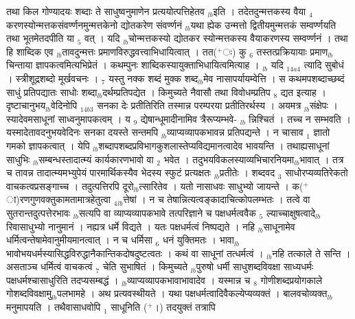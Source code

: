 \documentclass[article,12pt,a4paper]{memoir}%
\newcommand{\add}[1]{($^{+}$#1)}
\begin{document}
	  
	  \pstart \leavevmode%
	तथा किल गोण्यादयः शब्दाः ते साधुष्वनुमाणेन प्रत्ययोत्पत्तिहेतव {\tiny $_{lb}$}इति । तदेतदुन्मत्तकस्य वैया {\tiny $_{4}$} करणस्योन्मत्तकसंवर्ण्णनमुन्मत्तकेनो {\color{DodgerBlue3}द्योतकरेण} संवर्ण्णनं {\tiny $_{lb}$}यथा ह्येक उन्मत्तो द्वितीयमुन्मत्तकं सम्वर्ण्णयति तथा भूतमेतदपीति या {\tiny $_{5}$} वत् । यदि {\tiny $_{lb}$}चोन्मत्तकस्यो {\color{DodgerBlue3}द्योतकर} स्योन्मत्तकस्य वैयाकरणस्य सम्वर्ण्णनं । तथा हि शाब्दिक एव {\tiny $_{lb}$}तावदुन्मत्तः प्रमाणविरुद्धवत्त्वाभिधायित्वात् । तत\add{ः} कु {\tiny $_{6}$} तस्तत्प्रक्रियायाः प्रमाण{\tiny $_{lb}$}चिन्ताया ज्ञापकत्वमित्यभिप्रेतं । कथम्पुनः शाब्दिकस्यायुक्ताभिधायित्वमित्याह । {\tiny $_{lb}$} {\color{DodgerBlue3}यदि {\tiny $_{14a4}$} त्यादि} सुबोधं । स्त्रीशूद्रशब्दो मूर्खवचनः । {\tiny $_{7}$} यस्तु {\color{DodgerBlue3}नक्क} शब्दं {\color{DodgerBlue3}मुक्क} शब्द{\tiny $_{lb}$}मेव नासापर्यायम्वेत्ति । स कथमपशब्दाच्छब्दं साधुं प्रतिपद्यातः साधोः शब्दा{\tiny $_{lb}$}दर्थम्प्रतिपद्येत । किमुच्यते नैवासौ तथा विवोधम्प्रतिप {\tiny $_{8}$} द्यत इत्याह । {\color{DodgerBlue3}दृष्टाचानुभय{\tiny $_{lb}$}वेदिनोपि {\tiny $_{14b3}$} सनका} देः प्रतीतिरिति तस्मान्न परम्परया प्रतीतिरर्थस्य । अयमत्र {\tiny $_{lb}$}संक्षेपः । स्यादेवमसाधूनां साध्वनुमापकत्वम् । य {\tiny $_{9}$} \leavevmode{} द्येषान्धूमादीनामिव त्रैरूप्यम्भवे- {\tiny $_{lb}$} \leavevmode{} न्निश्चितं । तच्च न सम्भवति । यस्मादेतावदनुभयवेदिनः {\color{DodgerBlue3}सनका} दयस्ते सन्तमपि {\tiny $_{lb}$}व्याप्यव्यापकभावन्न प्रतिपद्यन्ते । न चासाव {\tiny $_{1}$} ज्ञातो गमको ज्ञापकत्वात् । येपि {\tiny $_{lb}$}शब्दापशब्दप्रविभागकुशलास्तेप्यविद्यमानत्वादेव भावयन्ति । तथाह्यसाधूनां साधुभिः {\tiny $_{lb}$}सम्बन्धस्तादात्म्यं कार्यकारणभावो वा {\tiny $_{2}$} भवेत । तदुभयविकलस्याव्यभिचारनियमा{\tiny $_{lb}$}भावात् । तत्र च तावन्न तादात्म्यमभ्युपेयं पारमार्थिकस्यैव भेदस्य स्फुटं प्रत्यक्षतः {\tiny $_{lb}$}प्रतीतेः । शब्दवद {\tiny $_{3}$} साधोरप्यव्यतिरेकतो वाचकत्वप्रसङ्गाच्च । तदुत्पत्तिरपि दूरो{\tiny $_{lb}$}त्सारितेव । यतो नासाधवः साधुभ्यो जायन्ते । क\add{ा}रणगुणवक्तुकामतामात्रहेतुत्वा {\tiny $_{4}$}{\tiny $_{lb}$}त्तेषां । न च तेषान्नित्यत्वङ्कादाचित्कोपलम्भतः । तत्वे वा सुतरान्तदुत्पत्तेरभावः {\tiny $_{lb}$}सत्यपि वा व्याप्यव्यापकभावे तत्परिज्ञाने च पक्षधर्मत्ववैक {\tiny $_{5}$} ल्याच्चाक्षुषत्वादे{\tiny $_{lb}$}रिवासाधुभ्यो नानुमानं । नह्यत्र धर्मे विद्यते । यतः पक्षधर्मत्वं निष्पद्यते । नहि {\tiny $_{lb}$}साधूनामेव धर्मित्वन्तेषामेवानुमीयमानत्वात् । न च धर्मिसा {\tiny $_{6}$} धनं युक्तिमतः । भावा{\tiny $_{lb}$}भावोभयधर्मस्यासिद्धविरुद्धानैकान्तिकदोषदुष्टत्वतः । कथं वा साधूनां तत्धर्मत्वं । {\tiny $_{lb}$}नहि तत्काले ते सन्ति । असताञ्च धर्मित्वं वाचकत्वं {\tiny $_{7}$} चेति सुभाषितं । किमुच्यते {\tiny $_{lb}$}पुरुषो धर्मी साधुशब्दविवक्षा साध्यधर्मः पक्षधर्मश्चासाधुरिति तदप्यसम्बद्धं । {\tiny $_{lb}$}व्याप्यव्यापकभावाभावादेव । यस्मान्न च {\tiny $_{8}$} \leavevmode{} गोणीशब्दप्रयोगकाले गोशब्दविवक्षामु{\tiny $_{lb}$}पलभामहे । अथ प्रत्यवस्थीयते । यथा पक्षधर्मत्वादिवैकल्येप्यव्यक्तं । बालवचोव्यक्त{\tiny $_{lb}$}मनुमापयति । तथैवासाधवोपि {\tiny $_{1}$} साधूनिति \add{।} तदयुक्तं तत्रापि 
\end{document}
